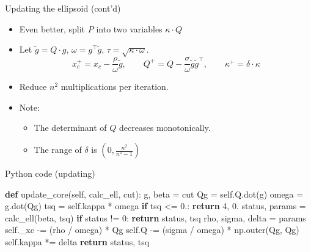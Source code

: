 \documentclass[10pt,ignorenonframetext,serif,onlymath]{beamer}
\newenvironment{Shaded}{}{}
\newcommand{\ControlFlowTok}[1]{\textcolor[rgb]{0.00,0.44,0.13}{\textbf{#1}}}
\newcommand{\DecValTok}[1]{\textcolor[rgb]{0.25,0.63,0.44}{#1}}
\newcommand{\FloatTok}[1]{\textcolor[rgb]{0.25,0.63,0.44}{#1}}
\newcommand{\KeywordTok}[1]{\textcolor[rgb]{0.00,0.44,0.13}{\textbf{#1}}}
\newcommand{\NormalTok}[1]{#1}
\newcommand{\OperatorTok}[1]{\textcolor[rgb]{0.40,0.40,0.40}{#1}}
\newcommand{\VariableTok}[1]{\textcolor[rgb]{0.10,0.09,0.49}{#1}}
\providecommand{\tightlist}{%
  \setlength{\itemsep}{0pt}\setlength{\parskip}{0pt}}
\begin{document}
\begin{frame}{Updating the ellipsoid (cont’d)}
\protect\hypertarget{updating-the-ellipsoid-contd}{}

\begin{itemize}
\tightlist
\item
  Even better, split \(P\) into two variables \(\kappa \cdot Q\)
\item
  Let \(\tilde{g} = Q \cdot g\), \(\omega = g^\top\tilde{g}\),
  \(\tau = \sqrt{\kappa\cdot\omega}\).
  \[x_c^+ = x_c - \frac{\rho}{\omega} \tilde{g}, \qquad
  Q^+ = Q - \frac{\sigma}{\omega} \tilde{g}\tilde{g}^\top, \qquad
  \kappa^+ =  \delta\cdot\kappa
   \]
\item
  Reduce \(n^2\) multiplications per iteration.
\item
  Note:

  \begin{itemize}
  \tightlist
  \item
    The determinant of \(Q\) decreases monotonically.
  \item
    The range of \(\delta\) is \((0, \frac{n^2}{n^2 - 1})\)
  \end{itemize}
\end{itemize}

\end{frame}

\begin{frame}[fragile]{Python code (updating)}
\protect\hypertarget{python-code-updating}{}

\begin{Shaded}
\begin{Highlighting}[]
\KeywordTok{def}\NormalTok{ update_core(}\VariableTok{self}\NormalTok{, calc_ell, cut):}
\NormalTok{    g, beta }\OperatorTok{=}\NormalTok{ cut}
\NormalTok{    Qg }\OperatorTok{=} \VariableTok{self}\NormalTok{.Q.dot(g)}
\NormalTok{    omega }\OperatorTok{=}\NormalTok{ g.dot(Qg)}
\NormalTok{    tsq }\OperatorTok{=} \VariableTok{self}\NormalTok{.kappa }\OperatorTok{*}\NormalTok{ omega}
    \ControlFlowTok{if}\NormalTok{ tsq }\OperatorTok{<=} \FloatTok{0.}\NormalTok{:}
        \ControlFlowTok{return} \DecValTok{4}\NormalTok{, }\FloatTok{0.}
\NormalTok{    status, params }\OperatorTok{=}\NormalTok{ calc_ell(beta, tsq)}
    \ControlFlowTok{if}\NormalTok{ status }\OperatorTok{!=} \DecValTok{0}\NormalTok{:}
        \ControlFlowTok{return}\NormalTok{ status, tsq}
\NormalTok{    rho, sigma, delta }\OperatorTok{=}\NormalTok{ params}
    \VariableTok{self}\NormalTok{._xc }\OperatorTok{-=}\NormalTok{ (rho }\OperatorTok{/}\NormalTok{ omega) }\OperatorTok{*}\NormalTok{ Qg}
    \VariableTok{self}\NormalTok{.Q }\OperatorTok{-=}\NormalTok{ (sigma }\OperatorTok{/}\NormalTok{ omega) }\OperatorTok{*}\NormalTok{ np.outer(Qg, Qg)}
    \VariableTok{self}\NormalTok{.kappa }\OperatorTok{*=}\NormalTok{ delta}
    \ControlFlowTok{return}\NormalTok{ status, tsq}
\end{Highlighting}
\end{Shaded}

\end{frame}
\end{document}
